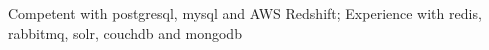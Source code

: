 \item Competent with postgresql, mysql and AWS Redshift; Experience with redis, rabbitmq, solr, couchdb and mongodb
